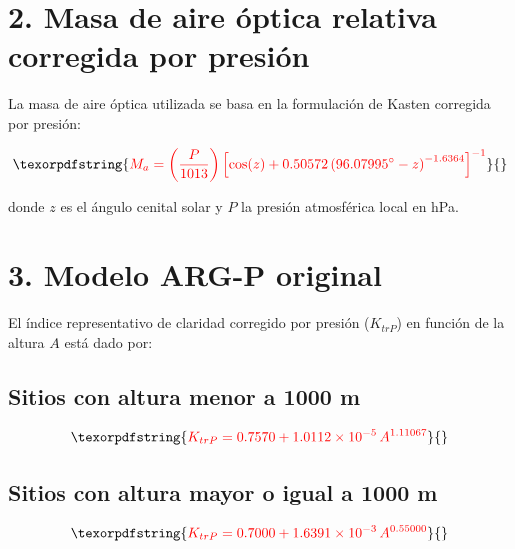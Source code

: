 \documentclass[letterpaper,12pt, twoside]{report}
\providecommand{\DIFdeltex}[1]{{\protect\color{red} \scriptsize #1}} %
\providecommand{\DIFdel}[1]{\texorpdfstring{\DIFdeltex{#1}}{}} %
\begin{document}
\section*{\DIFdel{2. Masa de aire óptica relativa corregida por presión}}

\DIFdel{La masa de aire óptica utilizada se basa en la formulación de Kasten corregida por presión:
}%

\begin{displaymath}
\DIFdel{M_a = \left( \frac{P}{1013} \right)
\left[
\cos(z) + 0.50572 \left( 96.07995^\circ - z \right)^{-1.6364}
\right]^{-1}
\label{eq:ma_kasten}
}\end{displaymath}%

\DIFdel{donde $z$ es el ángulo cenital solar y $P$ la presión atmosférica local en hPa.
}%

\section*{\DIFdel{3. Modelo ARG-P original}}

\DIFdel{El índice representativo de claridad corregido por presión ($K_{trP}$) en función de la altura $A$ 
está dado por:
}%

\subsection*{\DIFdel{Sitios con altura menor a 1000 m}}

\begin{displaymath}
\DIFdel{K_{trP} = 0.7570 + 1.0112 \times 10^{-5}\, A^{1.11067}
\label{eq:ktrp_low}
}\end{displaymath}%

\subsection*{\DIFdel{Sitios con altura mayor o igual a 1000 m}}

\begin{displaymath}
\DIFdel{K_{trP} = 0.7000 + 1.6391 \times 10^{-3}\, A^{0.55000}
\label{eq:ktrp_high}
}\end{displaymath}%
\end{document}
